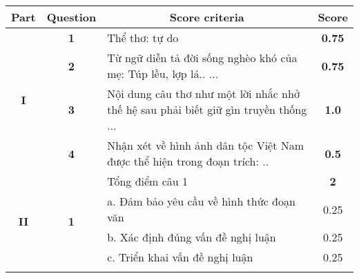 \documentclass{article}
\begin{document}
{	\begin{tabular}{|c|c|l|c|}
		\hline
		\textbf{Part}              & \textbf{Question}           & \multicolumn{1}{c|}{\textbf{Score criteria}}                                                                                                                                              & \textbf{Score}            \\ \hline
		\multirow{4}{*}{\textbf{I}}   & \textbf{1}                  & Thể thơ: tự do                                                                                                                                                                     & \textbf{0.75}             \\ \cline{2-4} 
		& \textbf{2}                  & Từ ngữ diễn tả đời sống nghèo khó của mẹ: Túp lều, lợp lá.. ...                                                                                                                   & \textbf{0.75}             \\ \cline{2-4} 
		& \textbf{3}                  & Nội dung câu thơ như một lời nhắc nhở thế hệ sau phải biết giữ gìn truyền thống ...                                                                                                                                                & \textbf{1.0}              \\ \cline{2-4} 
		& \textbf{4}                  & Nhận xét về hình ảnh dân tộc Việt Nam được thể hiện trong đoạn trích: ..                                                                                                         & \textbf{0.5}              \\ \hline
		\multirow{12}{*}{\textbf{II}} & \multirow{6}{*}{\textbf{1}} & Tổng điểm câu 1 & \textbf{2}                \\ \cline{3-4} 
		&                             & a. Đảm bảo yêu cầu về hình thức đoạn văn                                                                                                                                           & 0.25 \\ \cline{3-4} 
		&                             & b. Xác định đúng vấn đề nghị luận                                                                                                                                                  & 0.25 \\ \cline{3-4} 
		&                             & c. Triển khai vấn đề nghị luận                                                                                                                                                     & 0.25 \\ \cline{3-4} 

\end{tabular}}
\end{document}
